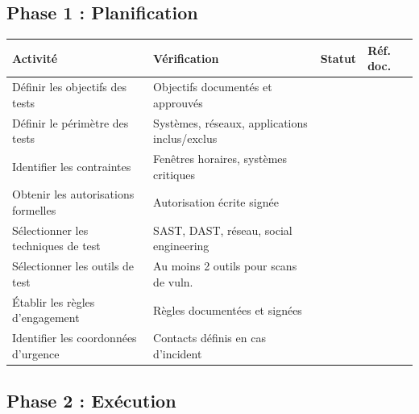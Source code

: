\documentclass[12pt,a4paper,oneside]{report}
\begin{document}
\subsection*{Phase 1 : Planification}

\begin{longtable}{|p{5.5cm}|p{5.5cm}|p{1.5cm}|p{1.5cm}|}
\hline
\rowcolor{theadcolor}
\color{white}\textbf{Activité} &
\color{white}\textbf{Vérification} &
\color{white}\textbf{Statut} &
\color{white}\textbf{Réf. doc.} \\
\hline\endhead\hline\endfoot
\rowcolor{trow1}
Définir les objectifs des tests &
  Objectifs documentés et approuvés & & \\
\hline\rowcolor{trow2}
Définir le périmètre des tests &
  Systèmes, réseaux, applications inclus/exclus & & \\
\hline\rowcolor{trow1}
Identifier les contraintes &
  Fenêtres horaires, systèmes critiques & & \\
\hline\rowcolor{trow2}
Obtenir les autorisations formelles &
  Autorisation écrite signée & & \\
\hline\rowcolor{trow1}
Sélectionner les techniques de test &
  SAST, DAST, réseau, social engineering & & \\
\hline\rowcolor{trow2}
Sélectionner les outils de test &
  Au moins 2 outils pour scans de vuln. & & \\
\hline\rowcolor{trow1}
Établir les règles d'engagement &
  Règles documentées et signées & & \\
\hline\rowcolor{trow2}
Identifier les coordonnées d'urgence &
  Contacts définis en cas d'incident & & \\
\hline
\end{longtable}

\subsection*{Phase 2 : Exécution}
\end{document}
